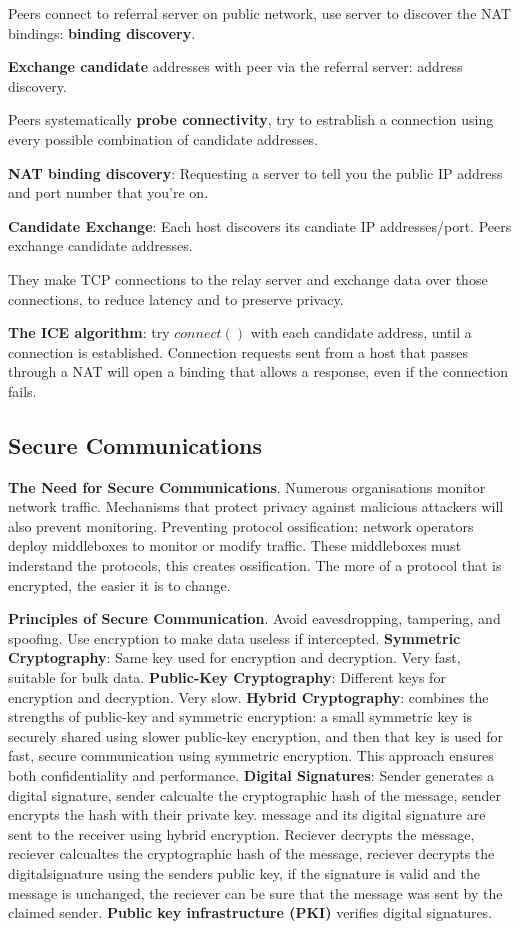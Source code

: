 \documentclass{article}
\begin{document}
Peers connect to referral server on public network, use server to discover the NAT bindings: \textbf{binding discovery}.

\textbf{Exchange candidate} addresses with peer via the referral server: address discovery.

Peers systematically \textbf{probe connectivity}, try to estrablish a connection using every possible combination of candidate addresses.

\textbf{NAT binding discovery}: Requesting a server to tell you the public IP address and port number that you're on.

\textbf{Candidate Exchange}: Each host discovers its candiate IP addresses/port. Peers exchange candidate addresses.

They make TCP connections to the relay server and exchange data over those connections, to reduce latency and to preserve privacy.

\textbf{The ICE algorithm}: try $connect()$ with each candidate address, until a connection is established.
Connection requests sent from a host that passes through a NAT will open a binding that allows a response, even if the connection fails.

\clearpage

\subsection*{Secure Communications}

\textbf{The Need for Secure Communications}. Numerous organisations monitor network traffic.
Mechanisms that protect privacy against malicious attackers will also prevent monitoring.
Preventing protocol ossification: network operators deploy middleboxes to monitor or modify traffic.
These middleboxes must inderstand the protocols, this creates ossification.
The more of a protocol that is encrypted, the easier it is to change.

\vspace{\baselineskip}
\textbf{Principles of Secure Communication}. Avoid eavesdropping, tampering, and spoofing.
Use encryption to make data useless if intercepted.
\textbf{Symmetric Cryptography}: Same key used for encryption and decryption. Very fast, suitable for bulk data.
\textbf{Public-Key Cryptography}: Different keys for encryption and decryption. Very slow.
\textbf{Hybrid Cryptography}: combines the strengths of public-key and symmetric encryption:
a small symmetric key is securely shared using slower public-key encryption,
and then that key is used for fast, secure communication using symmetric encryption.
This approach ensures both confidentiality and performance.
\textbf{Digital Signatures}: Sender generates a digital signature,
sender calcualte the cryptographic hash of the message,
sender encrypts the hash with their private key.
message and its digital signature are sent to the receiver using hybrid encryption.
Reciever decrypts the message,
reciever calcualtes the cryptographic hash of the message,
reciever decrypts the digitalsignature using the senders public key,
if the signature is valid and the message is unchanged, the reciever can be sure that the message was sent by the claimed sender.
\textbf{Public key infrastructure (PKI)} verifies digital signatures.
\end{document}
